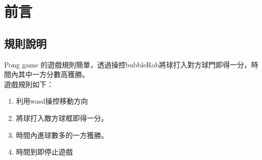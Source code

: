\chapter{前言}
\renewcommand{\baselinestretch}{10.0} %
\setcounter{page}{1}  %
\fontsize{14pt}{2.5pt}\sectionef
\section{規則說明}
 Pong game 的遊戲規則簡單，透過操控bubbleRob將球打入對方球門即得一分，時間內其中一方分數高獲勝。\\
遊戲規則如下：
\begin{enumerate}
\item 利用wasd操控移動方向
\item 將球打入敵方球框即得一分。
\item 時間內進球數多的一方獲勝。
\item 時間到即停止遊戲
\end{enumerate}

\renewcommand{\baselinestretch}{0.5} %